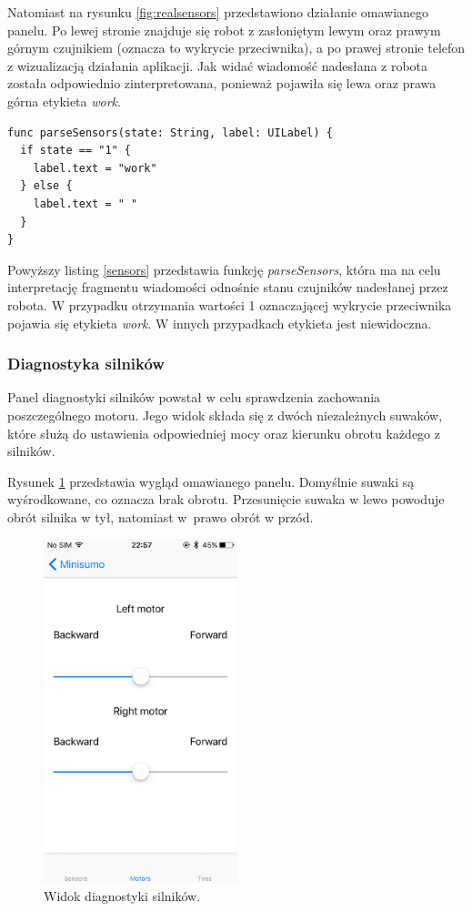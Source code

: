 Natomiast na rysunku \ref{fig:realsensors} przedstawiono działanie omawianego panelu. Po lewej stronie znajduje się robot z zasłoniętym lewym oraz prawym górnym czujnikiem (oznacza to wykrycie przeciwnika), a po prawej stronie telefon z wizualizacją działania aplikacji. Jak widać wiadomość nadesłana z robota została odpowiednio zinterpretowana, ponieważ pojawiła się lewa oraz prawa górna etykieta \textit{work}.

\begin{minipage}{\textwidth}
	\begin{lstlisting}[label=sensors,caption=Parsowanie wiadomości zawierającej stan czujników.]
func parseSensors(state: String, label: UILabel) {
  if state == "1" {
    label.text = "work"
  } else {
    label.text = " "
  }
}
	\end{lstlisting}
\end{minipage}

Powyższy listing \ref{sensors} przedstawia funkcję \textit{parseSensors}, która ma na celu interpretację fragmentu wiadomości odnośnie stanu czujników nadesłanej przez robota. W przypadku otrzymania wartości 1 oznaczającej wykrycie przeciwnika pojawia się etykieta \textit{work}. W innych przypadkach etykieta jest niewidoczna.
 
\subsubsection{Diagnostyka silników}
Panel diagnostyki silników powstał w celu sprawdzenia zachowania poszczególnego motoru. Jego widok składa się z dwóch niezależnych suwaków, które służą do ustawienia odpowiedniej mocy oraz kierunku obrotu każdego z silników.

Rysunek \ref{fig:motors} przedstawia wygląd omawianego panelu. Domyślnie suwaki są wyśrodkowane, co oznacza brak obrotu. Przesunięcie suwaka w lewo powoduje obrót silnika w tył, natomiast w~prawo obrót w przód.

\begin{figure}[H]
	\centering
		\includegraphics[width=0.75\linewidth, height=10cm, keepaspectratio, fbox]{pic05/motors.PNG}
	\caption{Widok diagnostyki silników.}
	\label{fig:motors}	
\end{figure}

